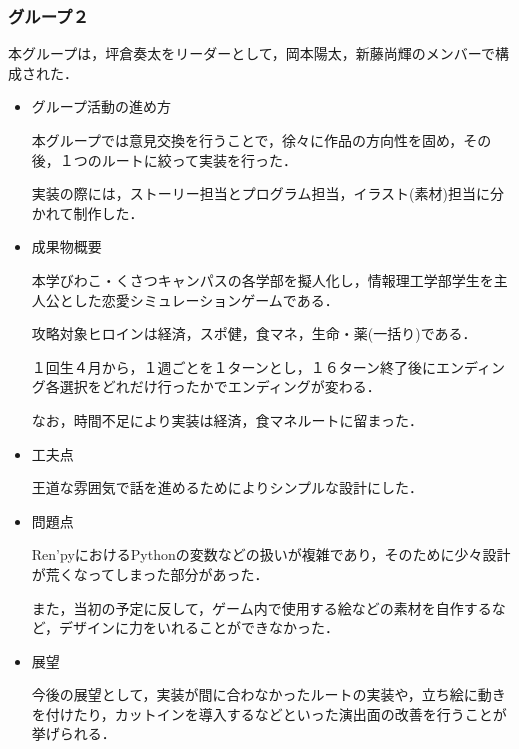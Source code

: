 \subsubsection{グループ２}

    本グループは，坪倉奏太をリーダーとして，岡本陽太，新藤尚輝のメンバーで構成された．

    \begin{itemize}
        \item グループ活動の進め方

        本グループでは意見交換を行うことで，徐々に作品の方向性を固め，その後，１つのルートに絞って実装を行った．
        
        実装の際には，ストーリー担当とプログラム担当，イラスト(素材)担当に分かれて制作した．

        \item 成果物概要

        本学びわこ・くさつキャンパスの各学部を擬人化し，情報理工学部学生を主人公とした恋愛シミュレーションゲームである．

        攻略対象ヒロインは経済，スポ健，食マネ，生命・薬(一括り)である．
        
        １回生４月から，１週ごとを１ターンとし，１６ターン終了後にエンディング各選択をどれだけ行ったかでエンディングが変わる．

        なお，時間不足により実装は経済，食マネルートに留まった．
      
        \item 工夫点

        王道な雰囲気で話を進めるためによりシンプルな設計にした．

        \item 問題点

        Ren'pyにおけるPythonの変数などの扱いが複雑であり，そのために少々設計が荒くなってしまった部分があった．

        また，当初の予定に反して，ゲーム内で使用する絵などの素材を自作するなど，デザインに力をいれることができなかった．

        \item 展望

        今後の展望として，実装が間に合わなかったルートの実装や，立ち絵に動きを付けたり，カットインを導入するなどといった演出面の改善を行うことが挙げられる．

    \end{itemize}
